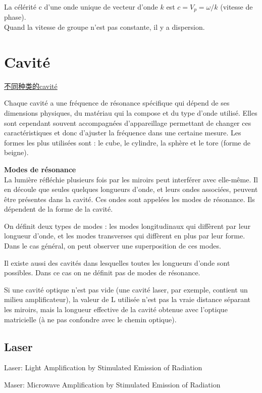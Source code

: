 \documentclass{article}
\begin{document}
La c\'el\'erit\'e c d'une onde unique de vecteur d'onde $k$ est $c = V_p = \omega / k$ (vitesse de phase). \\
Quand la vitesse de groupe n'est pas constante, il y a dispersion.

\section{Cavit\'e}
\href{http://fr.wikipedia.org/wiki/Cavit%C3%A9_optique#Types_de_cavit.C3.A9}{不同种类的cavit\'e}

Chaque cavité a une fréquence de résonance spécifique qui dépend de ses dimensions physiques, du matériau qui la compose et du type d'onde utilisé. Elles sont cependant souvent accompagnées d'appareillage permettant de changer ces caractéristiques et donc d'ajuster la fréquence dans une certaine mesure. Les formes les plus utilisées sont : le cube, le cylindre, la sphère et le tore (forme de beigne).

\textbf{Modes de résonance}\\
La lumière réfléchie plusieurs fois par les miroirs peut interférer avec elle-même. Il en découle que seules quelques longueurs d'onde, et leurs ondes associées, peuvent être présentes dans la cavité. Ces ondes sont appelées les modes de résonance. Ils dépendent de la forme de la cavité.

On définit deux types de modes : les modes longitudinaux qui diffèrent par leur longueur d'onde, et les modes transverses qui diffèrent en plus par leur forme. Dans le cas général, on peut observer une superposition de ces modes.

Il existe aussi des cavités dans lesquelles toutes les longueurs d'onde sont possibles. Dans ce cas on ne définit pas de modes de résonance.

Si une cavité optique n'est pas vide (une cavité laser, par exemple, contient un milieu amplificateur), la valeur de L utilisée n'est pas la vraie distance séparant les miroirs, mais la longueur effective de la cavité obtenue avec l'optique matricielle (à ne pas confondre avec le chemin optique). 

\subsection{Laser}
Laser: Light Amplification by Stimulated Emission of Radiation

Maser: Microwave Amplification by Stimulated Emission of Radiation
\end{document}
